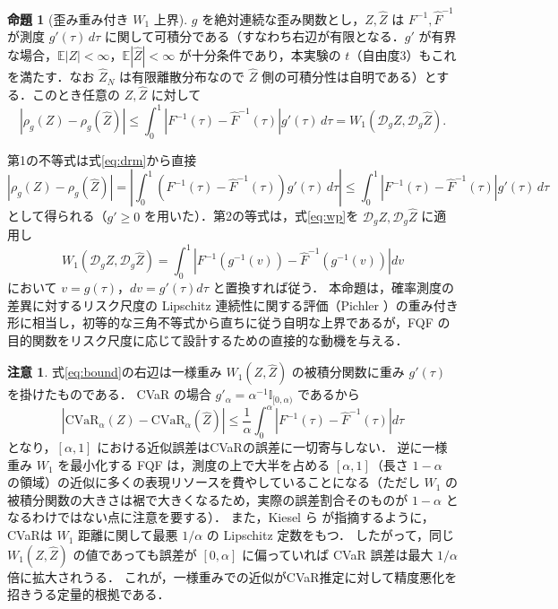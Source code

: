 \documentclass[a4paper,10pt]{jsarticle}
\makeatletter
\theoremstyle{definition}
\newtheorem{proposition}{命題}[section]
\newtheorem{remark}{注意}[section]
\renewenvironment{proof}[1][\proofname]{\par
  \pushQED{\qed}%
  \normalfont \topsep6\p@\@plus6\p@\relax
  \trivlist
  \item[\hskip\labelsep\textbf{#1}]\ignorespaces
}{%
  \popQED\endtrivlist\@endpefalse
}
\renewcommand{\proofname}{証明}
\newcommand{\CVaR}{\mathrm{CVaR}}
\newcommand{\Wone}{W_1}
\newcommand{\Finv}{F^{-1}}
\newcommand{\Fhinv}{\hat{F}^{-1}}
\newcommand{\E}{\mathbb{E}}
\newcommand{\dist}{\mathcal{D}_g}
\makeatother
\begin{document}
\begin{proposition}[歪み重み付き $\Wone$ 上界]
\label{prop:bound}
$g$ を絶対連続な歪み関数とし，$Z,\hat Z$ は $\Finv,\Fhinv$ が測度 $g'(\tau)\,d\tau$ に関して可積分である（すなわち右辺が有限となる．$g'$ が有界な場合，$\E|Z|<\infty$，$\E|\hat Z|<\infty$ が十分条件であり，本実験の $t$（自由度3）もこれを満たす．なお $\hat Z_N$ は有限離散分布なので $\hat Z$ 側の可積分性は自明である）とする．このとき任意の $Z,\hat Z$ に対して
\begin{equation}
  \left|\rho_g(Z)-\rho_g(\hat Z)\right|
  \le\int_0^1\left|\Finv(\tau)-\Fhinv(\tau)\right|g'(\tau)\,d\tau
  =\Wone(\dist Z,\dist\hat Z).
  \label{eq:bound}
\end{equation}
\end{proposition}
\begin{proof}
第1の不等式は式\eqref{eq:drm}から直接
\begin{equation*}
  \left|\rho_g(Z)-\rho_g(\hat Z)\right|=\left|\int_0^1\left(\Finv(\tau)-\Fhinv(\tau)\right)g'(\tau)\,d\tau\right|
  \le\int_0^1\left|\Finv(\tau)-\Fhinv(\tau)\right|g'(\tau)\,d\tau
\end{equation*}
として得られる（$g'\ge0$ を用いた）．第2の等式は，式\eqref{eq:wp}を $\dist Z,\dist\hat Z$ に適用し
\begin{equation*}
  \Wone(\dist Z,\dist\hat Z)=\int_0^1\left|\Finv(g^{-1}(v))-\Fhinv(g^{-1}(v))\right|dv
\end{equation*}
において $v=g(\tau)$，$dv=g'(\tau)d\tau$ と置換すれば従う．
\end{proof}
本命題は，確率測度の差異に対するリスク尺度の Lipschitz 連続性に関する評価（Pichler \cite{pichler2013evaluations}）の重み付き形に相当し，初等的な三角不等式から直ちに従う自明な上界であるが，FQF の目的関数をリスク尺度に応じて設計するための直接的な動機を与える．

\begin{remark}
式\eqref{eq:bound}の右辺は一様重み $\Wone(Z,\hat Z)$ の被積分関数に重み $g'(\tau)$ を掛けたものである．
CVaR の場合 $g'_\alpha=\alpha^{-1}\mathbb{I}_{[0,\alpha)}$ であるから
\begin{equation}
  \left|\CVaR_\alpha(Z)-\CVaR_\alpha(\hat Z)\right|\le\frac1\alpha\int_0^\alpha\left|\Finv(\tau)-\Fhinv(\tau)\right|d\tau
  \label{eq:bound-cvar}
\end{equation}
となり，$[\alpha,1]$ における近似誤差はCVaRの誤差に一切寄与しない．
逆に一様重み $\Wone$ を最小化する FQF は，測度の上で大半を占める $[\alpha,1]$（長さ $1-\alpha$ の領域）の近似に多くの表現リソースを費やしていることになる（ただし $W_1$ の被積分関数の大きさは裾で大きくなるため，実際の誤差割合そのものが $1-\alpha$ となるわけではない点に注意を要する）．
また，Kiesel ら \cite{kiesel2016wasserstein} が指摘するように，CVaRは $W_1$ 距離に関して最悪 $1/\alpha$ の Lipschitz 定数をもつ．
したがって，同じ $\Wone(Z,\hat Z)$ の値であっても誤差が $[0,\alpha]$ に偏っていれば CVaR 誤差は最大 $1/\alpha$ 倍に拡大されうる．
これが，一様重みでの近似がCVaR推定に対して精度悪化を招きうる定量的根拠である．
\end{remark}
\end{document}
